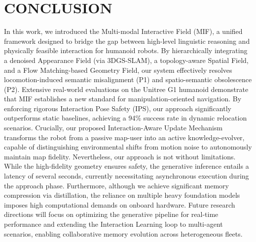 \documentclass[conference]{IEEEtran}
\begin{document}
\section{CONCLUSION}
\label{sec:conclusion}

In this work, we introduced the Multi-modal Interactive Field (MIF), a unified framework designed to bridge the gap between high-level linguistic reasoning and physically feasible interaction for humanoid robots. By hierarchically integrating a denoised Appearance Field (via 3DGS-SLAM), a topology-aware Spatial Field, and a Flow Matching-based Geometry Field, our system effectively resolves locomotion-induced semantic misalignment (P1) and spatio-semantic obsolescence (P2). Extensive real-world evaluations on the Unitree G1 humanoid demonstrate that MIF establishes a new standard for manipulation-oriented navigation. By enforcing rigorous Interaction Pose Safety (IPS), our approach significantly outperforms static baselines, achieving a 94\% success rate in dynamic relocation scenarios. Crucially, our proposed Interaction-Aware Update Mechanism transforms the robot from a passive map-user into an active knowledge-evolver, capable of distinguishing environmental shifts from motion noise to autonomously maintain map fidelity. Nevertheless, our approach is not without limitations. While the high-fidelity geometry ensures safety, the generative inference entails a latency of several seconds, currently necessitating asynchronous execution during the approach phase. Furthermore, although we achieve significant memory compression via distillation, the reliance on multiple heavy foundation models imposes high computational demands on onboard hardware. Future research directions will focus on optimizing the generative pipeline for real-time performance and extending the Interaction Learning loop to multi-agent scenarios, enabling collaborative memory evolution across heterogeneous fleets. 






\clearpage
\renewcommand{\baselinestretch}{1}
\setlength{\belowcaptionskip}{0pt}
\end{document}
